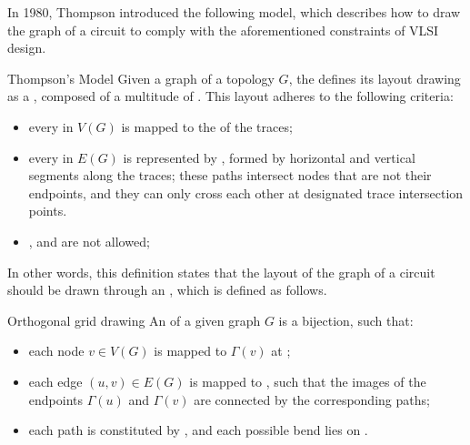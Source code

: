 \documentclass[a4paper, 12pt]{report}
\begin{document}
    In 1980, Thompson introduced the following model, which describes how to draw the graph of a circuit to comply with the aforementioned constraints of VLSI design.

    \begin{frameddefn}{Thompson's Model}
        Given a graph of a topology $G$, the  defines its layout drawing as a , composed of a multitude of . This layout adheres to the following criteria:

        \begin{itemize}
            \item every  in $V(G)$ is mapped to the  of the traces;
            \item every  in $E(G)$ is represented by , formed by horizontal and vertical segments along the traces; these paths  intersect nodes that are not their endpoints, and they can only cross each other at designated trace intersection points.
            \item {},  and  are not allowed;
        \end{itemize}
    \end{frameddefn}

    In other words, this definition states that the layout of the graph of a circuit should be drawn through an , which is defined as follows.

    \begin{frameddefn}{Orthogonal grid drawing}
        An  of a given graph $G$ is a bijection, such that:

        \begin{itemize}
            \item each node $v \in V(G)$ is mapped to  $\Gamma(v)$ at ;
            \item each edge $(u, v) \in E(G)$ is mapped to , such that the images of the endpoints $\Gamma(u)$ and $\Gamma(v)$ are connected by the corresponding paths;
            \item each path is constituted by , and each possible bend lies on .
        \end{itemize}
    \end{frameddefn}
\end{document}

